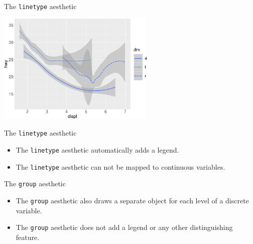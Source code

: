 \documentclass[ignorenonframetext,]{beamer}
\providecommand{\tightlist}{%
  \setlength{\itemsep}{0pt}\setlength{\parskip}{0pt}}
\begin{document}
\begin{frame}{The \texttt{linetype} aesthetic}
\protect\hypertarget{the-linetype-aesthetic-1}{}

\begin{center}\includegraphics[height=200px]{data-visualization_files/figure-beamer/unnamed-chunk-29-1} \end{center}

\end{frame}

\begin{frame}[fragile]{The \texttt{linetype} aesthetic}
\protect\hypertarget{the-linetype-aesthetic-2}{}

\begin{itemize}
\tightlist
\item
  The \texttt{linetype} aesthetic automatically adds a legend.
\item
  The \texttt{linetype} aesthetic can not be mapped to continuous
  variables.
\end{itemize}

\end{frame}

\begin{frame}[fragile]{The \texttt{group} aesthetic}
\protect\hypertarget{the-group-aesthetic}{}

\begin{itemize}
\item
  The \texttt{group} aesthetic also draws a separate object for each
  level of a discrete variable.
\item
  The \texttt{group} aesthetic does not add a legend or any other
  distinguishing feature.
\end{itemize}

\end{frame}
\end{document}
